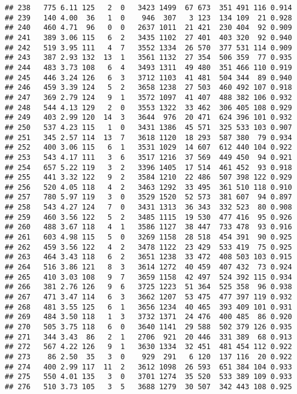 \documentclass[]{article}
\begin{document}
\begin{verbatim}
## 238   775 6.11 125   2  0   3423 1499  67 673  351 491 116 0.914
## 239   140 4.00  36   1  0    946  307   3 123  134 109  21 0.928
## 240   460 4.71  96   0  0   2637 1011  21 421  230 404  92 0.909
## 241   389 3.06 115   6  2   3435 1102  27 401  403 320  92 0.940
## 242   519 3.95 111   4  7   3552 1334  26 570  377 531 114 0.909
## 243   387 2.93 132  13  1   3561 1132  27 354  506 359  77 0.935
## 244   483 3.73 108   6  4   3493 1311  49 480  351 466 110 0.919
## 245   446 3.24 126   6  3   3712 1103  41 481  504 344  89 0.940
## 246   459 3.39 124   5  2   3658 1238  27 503  460 492 107 0.918
## 247   369 2.79 124   9  1   3572 1097  41 407  488 382 106 0.932
## 248   544 4.13 129   2  0   3553 1322  33 462  306 405 108 0.929
## 249   403 2.99 120  14  3   3644  976  20 471  624 396 101 0.932
## 250   537 4.23 115   1  0   3431 1386  45 571  325 533 103 0.907
## 251   345 2.57 114  13  7   3618 1120  18 293  587 380  79 0.934
## 252   400 3.06 115   6  1   3531 1029  14 607  612 440 104 0.922
## 253   543 4.17 111   3  6   3517 1216  37 569  449 450  94 0.921
## 254   657 5.22 119   3  2   3396 1405  17 514  461 452  93 0.918
## 255   441 3.32 122   9  2   3584 1210  22 486  507 398 122 0.929
## 256   520 4.05 118   4  2   3463 1292  33 495  361 510 118 0.910
## 257   780 5.97 119   3  0   3529 1520  52 573  381 607  94 0.897
## 258   543 4.27 124   7  0   3431 1313  36 343  332 523  80 0.908
## 259   460 3.56 122   5  2   3485 1115  19 530  477 416  95 0.926
## 260   488 3.67 118   4  1   3586 1127  38 447  733 478  93 0.916
## 261   603 4.98 115   5  0   3269 1158  28 518  454 391  90 0.925
## 262   459 3.56 122   4  2   3478 1122  23 429  533 419  75 0.925
## 263   464 3.43 118   6  2   3651 1238  33 472  408 503 103 0.915
## 264   516 3.86 121   8  3   3614 1272  40 459  407 432  73 0.924
## 265   410 3.03 108   9  7   3659 1158  42 497  524 392 115 0.934
## 266   381 2.76 126   9  6   3725 1223  51 364  525 358  96 0.938
## 267   471 3.47 114   6  3   3662 1207  53 475  477 397 119 0.932
## 268   481 3.55 125   6  1   3656 1234  40 465  393 409 101 0.931
## 269   484 3.50 118   1  3   3732 1371  24 476  400 485  86 0.920
## 270   505 3.75 118   6  0   3640 1141  29 588  502 379 126 0.935
## 271   344 3.43  86   2  1   2706  921  20 446  331 389  68 0.913
## 272   567 4.22 126   9  1   3630 1334  32 451  481 454 112 0.922
## 273    86 2.50  35   3  0    929  291   6 120  137 116  20 0.922
## 274   400 2.99 117  11  2   3612 1098  26 593  651 384 104 0.933
## 275   550 4.01 135   3  0   3701 1274  35 520  533 389 109 0.933
## 276   510 3.73 105   3  5   3688 1279  30 507  342 443 108 0.925

\end{verbatim}
\end{document}
